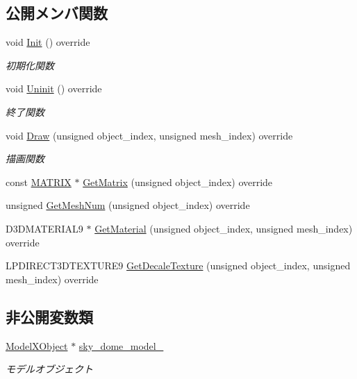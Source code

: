 \subsection*{公開メンバ関数}
\begin{DoxyCompactItemize}
\item 
void \mbox{\hyperlink{class_sky_dome_draw_a5b82e8b650a20dbc0b7ed720d1fb7fab}{Init}} () override
\begin{DoxyCompactList}\small\item\em 初期化関数 \end{DoxyCompactList}\item 
void \mbox{\hyperlink{class_sky_dome_draw_aee1c6b102a97033073b2559b8c2c328b}{Uninit}} () override
\begin{DoxyCompactList}\small\item\em 終了関数 \end{DoxyCompactList}\item 
void \mbox{\hyperlink{class_sky_dome_draw_a42364ea42618cbab588d55050edfe95a}{Draw}} (unsigned object\+\_\+index, unsigned mesh\+\_\+index) override
\begin{DoxyCompactList}\small\item\em 描画関数 \end{DoxyCompactList}\item 
const \mbox{\hyperlink{_vector3_d_8h_a032295cd9fb1b711757c90667278e744}{M\+A\+T\+R\+IX}} $\ast$ \mbox{\hyperlink{class_sky_dome_draw_ab947a3d43975a6d95149bc112c08ce05}{Get\+Matrix}} (unsigned object\+\_\+index) override
\item 
unsigned \mbox{\hyperlink{class_sky_dome_draw_a7ecd8d4b987e4d58a247d3438a45f9d4}{Get\+Mesh\+Num}} (unsigned object\+\_\+index) override
\item 
D3\+D\+M\+A\+T\+E\+R\+I\+A\+L9 $\ast$ \mbox{\hyperlink{class_sky_dome_draw_acbc487d912b464474ae6f1afd7d6bb74}{Get\+Material}} (unsigned object\+\_\+index, unsigned mesh\+\_\+index) override
\item 
L\+P\+D\+I\+R\+E\+C\+T3\+D\+T\+E\+X\+T\+U\+R\+E9 \mbox{\hyperlink{class_sky_dome_draw_a1d708782f13648724e423d1dca22b213}{Get\+Decale\+Texture}} (unsigned object\+\_\+index, unsigned mesh\+\_\+index) override
\end{DoxyCompactItemize}
\subsection*{非公開変数類}
\begin{DoxyCompactItemize}
\item 
\mbox{\hyperlink{class_model_x_object}{Model\+X\+Object}} $\ast$ \mbox{\hyperlink{class_sky_dome_draw_a2453fb04f979443c61acc10eafa183aa}{sky\+\_\+dome\+\_\+model\+\_\+}}
\begin{DoxyCompactList}\small\item\em モデルオブジェクト \end{DoxyCompactList}\end{DoxyCompactItemize}
